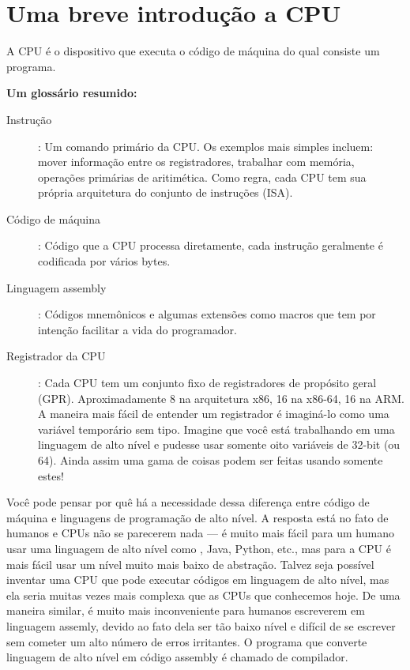 \ifdefined\BRAZILIAN
\chapter{Uma breve introdução a CPU}

A \ac{CPU} é o dispositivo que executa o código de máquina do qual consiste um programa.

\textbf{Um glossário resumido:}

\begin{description}
\item[Instrução]: Um comando primário da \ac{CPU}. Os exemplos mais simples incluem: mover informação entre os registradores, trabalhar com memória, operações primárias de aritimética.
Como regra, cada \ac{CPU} tem sua própria arquitetura do conjunto de instruções (\ac{ISA}).

\item[Código de máquina]: Código que a \ac{CPU} processa diretamente, cada instrução geralmente é codificada por vários bytes.

\item[Linguagem assembly]: Códigos mnemônicos e algumas extensões como macros que tem por intenção facilitar a vida do programador.

\item[Registrador da CPU]: Cada \ac{CPU} tem um conjunto fixo de registradores de propósito geral (\ac{GPR}).
Aproximadamente 8 na arquitetura x86, 16 na x86-64, 16 na ARM.
A maneira mais fácil de entender um registrador é imaginá-lo como uma variável temporário sem tipo.
Imagine que você está trabalhando em uma linguagem de alto nível e pudesse usar somente oito variáveis de 32-bit (ou 64).
Ainda assim uma gama de coisas podem ser feitas usando somente estes!

\end{description}

Você pode pensar por quê há a necessidade dessa diferença entre código de máquina e linguagens de programação de alto nível.
A resposta está no fato de humanos e CPUs não se parecerem nada --- é muito mais fácil para um humano usar uma linguagem de alto nível como \CCpp, Java, Python, etc., 
mas para a CPU é mais fácil usar um nível muito mais baixo de abstração.
Talvez seja possível inventar uma CPU que pode executar códigos em linguagem de alto nível, mas ela seria muitas vezes mais complexa que as CPUs que conhecemos hoje.
De uma maneira similar, é muito mais inconveniente para humanos escreverem em linguagem assemly,
devido ao fato dela ser tão baixo nível e difícil de se escrever sem cometer um alto número de erros irritantes. O programa que converte linguagem de alto nível em código assembly é chamado de compilador.

